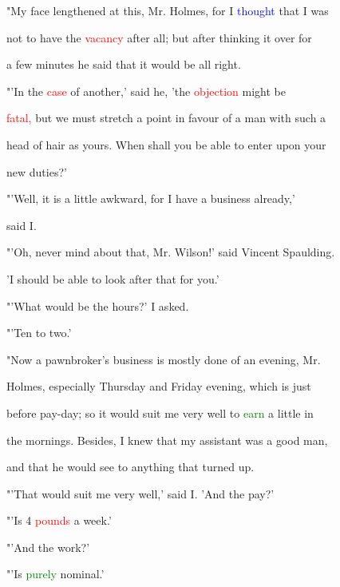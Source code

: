  "My face lengthened at this, Mr. Holmes, for I \textcolor{blue}{thought} that I was

 not to have the \textcolor{red}{vacancy} after all; but after thinking it over for

 a few minutes he said that it would be all right.



 "'In the \textcolor{red}{case} of another,' said he, 'the \textcolor{red}{objection} might be

 \textcolor{red}{fatal,} but we must stretch a point in favour of a man with such a

 head of hair as yours. When shall you be able to enter upon your

 new duties?'



 "'Well, it is a little awkward, for I have a business already,'

 said I.



 "'Oh, never mind about that, Mr. Wilson!' said Vincent Spaulding.

 'I should be able to look after that for you.'



 "'What would be the hours?' I asked.



 "'Ten to two.'



 "Now a pawnbroker's business is mostly done of an evening, Mr.

 Holmes, especially Thursday and Friday evening, which is just

 before pay-day; so it would suit me very well to \textcolor{green}{earn} a little in

 the mornings. Besides, I knew that my assistant was a \textcolor{BurntOrange}{good} man,

 and that he would see to anything that turned up.



 "'That would suit me very well,' said I. 'And the \textcolor{BurntOrange}{pay?'}



 "'Is 4 \textcolor{red}{pounds} a week.'



 "'And the work?'



 "'Is \textcolor{green}{purely} nominal.'




